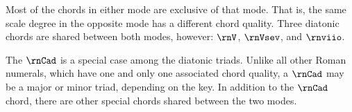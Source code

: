 
Most of the chords in either mode are exclusive of that
mode. That is, the same scale degree in the opposite mode
has a different chord quality. Three diatonic chords are
shared between both modes, however: $\rnV$, $\rnVsev$, and
$\rnviio$. 

The $\rnCad$ is a special case among the diatonic triads.
Unlike all other Roman numerals, which have one and only one
associated chord quality, a $\rnCad$ may be a major or minor
triad, depending on the key. In addition to the $\rnCad$
chord, there are other special chords shared between the two
modes.


